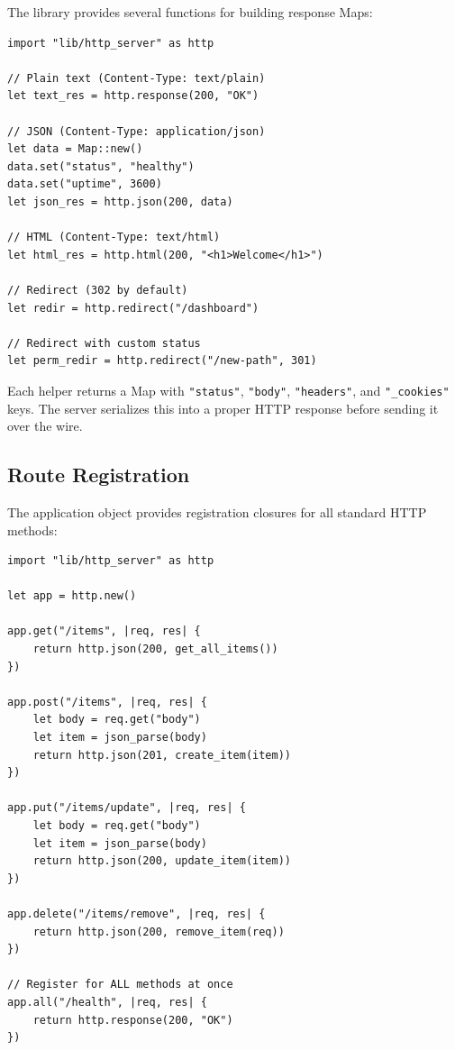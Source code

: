The library provides several functions for building response Maps:

\begin{lstlisting}[language=Lattice, caption={Response helper functions}]
import "lib/http_server" as http

// Plain text (Content-Type: text/plain)
let text_res = http.response(200, "OK")

// JSON (Content-Type: application/json)
let data = Map::new()
data.set("status", "healthy")
data.set("uptime", 3600)
let json_res = http.json(200, data)

// HTML (Content-Type: text/html)
let html_res = http.html(200, "<h1>Welcome</h1>")

// Redirect (302 by default)
let redir = http.redirect("/dashboard")

// Redirect with custom status
let perm_redir = http.redirect("/new-path", 301)
\end{lstlisting}

Each helper returns a Map with \lstinline|"status"|, \lstinline|"body"|, \lstinline|"headers"|, and \lstinline|"_cookies"| keys.
The server serializes this into a proper HTTP response before sending it over the wire.

\subsection{Route Registration}\label{sec:http-routes}


The application object provides registration closures for all standard HTTP methods:

\begin{lstlisting}[language=Lattice, caption={Registering routes for different HTTP methods}]
import "lib/http_server" as http

let app = http.new()

app.get("/items", |req, res| {
    return http.json(200, get_all_items())
})

app.post("/items", |req, res| {
    let body = req.get("body")
    let item = json_parse(body)
    return http.json(201, create_item(item))
})

app.put("/items/update", |req, res| {
    let body = req.get("body")
    let item = json_parse(body)
    return http.json(200, update_item(item))
})

app.delete("/items/remove", |req, res| {
    return http.json(200, remove_item(req))
})

// Register for ALL methods at once
app.all("/health", |req, res| {
    return http.response(200, "OK")
})
\end{lstlisting}

